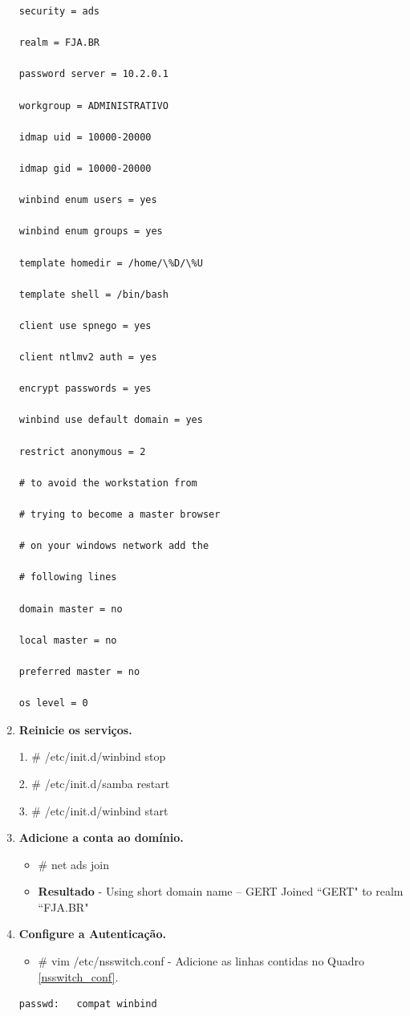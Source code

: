 \begin{enumerate}
\begin{lstlisting}[caption=Arquivo smb.conf para fazer \textit{login} em um domínio.,label={smb_conf}]
security = ads
		
realm = FJA.BR

password server = 10.2.0.1

workgroup = ADMINISTRATIVO

idmap uid = 10000-20000

idmap gid = 10000-20000

winbind enum users = yes

winbind enum groups = yes

template homedir = /home/\%D/\%U

template shell = /bin/bash

client use spnego = yes

client ntlmv2 auth = yes

encrypt passwords = yes

winbind use default domain = yes

restrict anonymous = 2

# to avoid the workstation from

# trying to become a master browser

# on your windows network add the

# following lines

domain master = no

local master = no

preferred master = no

os level = 0
\end{lstlisting}

	\item \textbf{Reinicie os serviços.}
	
			1. \# /etc/init.d/winbind stop
			
			2. \# /etc/init.d/samba restart
			
			3. \# /etc/init.d/winbind start

	\item \textbf{Adicione a conta ao domínio.}\\
		\begin{itemize}
			\item \# net ads join
		\end{itemize} 
		\begin{itemize}
			\item \textbf{Resultado} - Using short domain name – GERT Joined ``GERT" to realm ``FJA.BR"
		\end{itemize}

	\item \textbf{Configure a Autenticação.}
		\begin{itemize}
				\item {\# vim /etc/nsswitch.conf} - Adicione as linhas contidas no Quadro \ref{nsswitch_conf}.\\
		\end{itemize}
		\begin{lstlisting}[caption=Arquivo /etc/nsswitch.conf,label={nsswitch_conf}]
passwd:   compat winbind


\end{lstlisting}
\end{enumerate}
